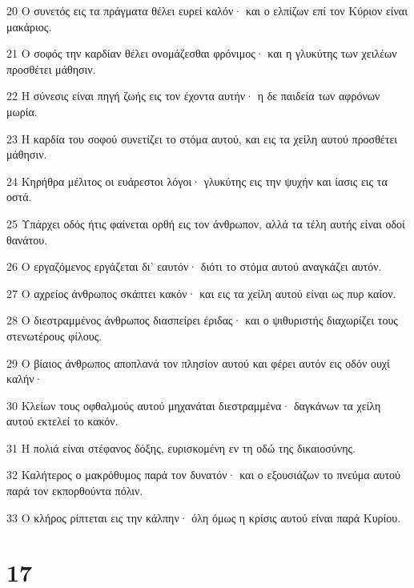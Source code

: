 \par 20 Ο συνετός εις τα πράγματα θέλει ευρεί καλόν· και ο ελπίζων επί τον Κύριον είναι μακάριος.
\par 21 Ο σοφός την καρδίαν θέλει ονομάζεσθαι φρόνιμος· και η γλυκύτης των χειλέων προσθέτει μάθησιν.
\par 22 Η σύνεσις είναι πηγή ζωής εις τον έχοντα αυτήν· η δε παιδεία των αφρόνων μωρία.
\par 23 Η καρδία του σοφού συνετίζει το στόμα αυτού, και εις τα χείλη αυτού προσθέτει μάθησιν.
\par 24 Κηρήθρα μέλιτος οι ευάρεστοι λόγοι· γλυκύτης εις την ψυχήν και ίασις εις τα οστά.
\par 25 Υπάρχει οδός ήτις φαίνεται ορθή εις τον άνθρωπον, αλλά τα τέλη αυτής είναι οδοί θανάτου.
\par 26 Ο εργαζόμενος εργάζεται δι' εαυτόν· διότι το στόμα αυτού αναγκάζει αυτόν.
\par 27 Ο αχρείος άνθρωπος σκάπτει κακόν· και εις τα χείλη αυτού είναι ως πυρ καίον.
\par 28 Ο διεστραμμένος άνθρωπος διασπείρει έριδας· και ο ψιθυριστής διαχωρίζει τους στενωτέρους φίλους.
\par 29 Ο βίαιος άνθρωπος αποπλανά τον πλησίον αυτού και φέρει αυτόν εις οδόν ουχί καλήν·
\par 30 Κλείων τους οφθαλμούς αυτού μηχανάται διεστραμμένα· δαγκάνων τα χείλη αυτού εκτελεί το κακόν.
\par 31 Η πολιά είναι στέφανος δόξης, ευρισκομένη εν τη οδώ της δικαιοσύνης.
\par 32 Καλήτερος ο μακρόθυμος παρά τον δυνατόν· και ο εξουσιάζων το πνεύμα αυτού παρά τον εκπορθούντα πόλιν.
\par 33 Ο κλήρος ρίπτεται εις την κάλπην· όλη όμως η κρίσις αυτού είναι παρά Κυρίου.

\chapter{17}

